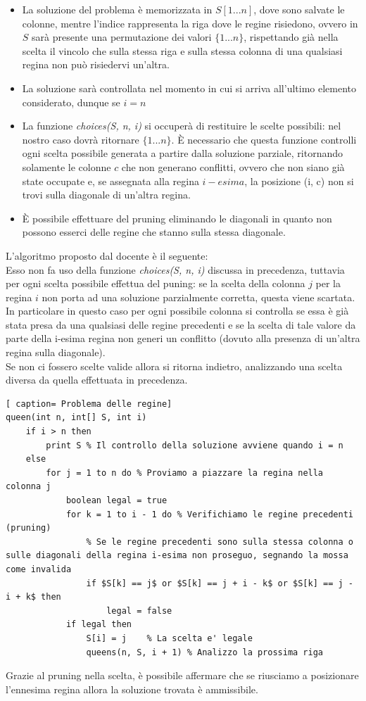 \documentclass[../cheatSheetAlgoritmi.tex]{subfiles}
\begin{document}
\begin{itemize}
	\item La soluzione del problema è memorizzata in $S[1 ... n]$, dove sono salvate le colonne, mentre l'indice rappresenta la riga dove le regine risiedono, ovvero in $S$ sarà presente una permutazione dei valori $\{1 ... n\}$, rispettando già nella scelta il vincolo che sulla stessa riga e sulla stessa colonna di una qualsiasi regina non può risiedervi un'altra.
	\item La soluzione sarà controllata nel momento in cui si arriva all'ultimo elemento considerato, dunque se $i = n$
	\item La funzione \emph{choices(S, n, i)} si occuperà di restituire le scelte possibili: nel nostro caso dovrà ritornare $\{1 ... n\}$. È necessario che questa funzione controlli ogni scelta possibile generata a partire dalla soluzione parziale, ritornando solamente le colonne $c$ che non generano conflitti, ovvero che non siano già state occupate e, se assegnata alla regina $i-esima$, la posizione (i, c) non si trovi sulla diagonale di un'altra regina.
	\item È possibile effettuare del pruning eliminando le diagonali in quanto non possono esserci delle regine che stanno sulla stessa diagonale.
\end{itemize}
L'algoritmo proposto dal docente è il seguente: \\
Esso non fa uso della funzione \emph{choices(S, n, i)} discussa in precedenza, tuttavia per ogni scelta possibile effettua del puning: se la scelta della colonna $j$ per la regina $i$ non porta ad una soluzione parzialmente corretta, questa viene scartata. \\
In particolare in questo caso per ogni possibile colonna si controlla se essa è già stata presa da una qualsiasi delle regine precedenti e se la scelta di tale valore da parte della i-esima regina non generi un conflitto (dovuto alla presenza di un'altra regina sulla diagonale). \\
Se non ci fossero scelte valide allora si ritorna indietro, analizzando una scelta diversa da quella effettuata in precedenza.
 \begin{lstlisting}[ caption= Problema delle regine]
queen(int n, int[] S, int i)
	if i > n then
		print S % Il controllo della soluzione avviene quando i = n
	else 
		for j = 1 to n do % Proviamo a piazzare la regina nella colonna j
			boolean legal = true
			for k = 1 to i - 1 do % Verifichiamo le regine precedenti (pruning)
				% Se le regine precedenti sono sulla stessa colonna o sulle diagonali della regina i-esima non proseguo, segnando la mossa come invalida
				if $S[k] == j$ or $S[k] == j + i - k$ or $S[k] == j -  i + k$ then
					legal = false 
			if legal then
				S[i] = j	% La scelta e' legale
				queens(n, S, i + 1) % Analizzo la prossima riga
\end{lstlisting}
Grazie al pruning nella scelta, è possibile affermare che se riusciamo a posizionare l'ennesima regina allora la soluzione trovata è ammissibile.
\end{document}
